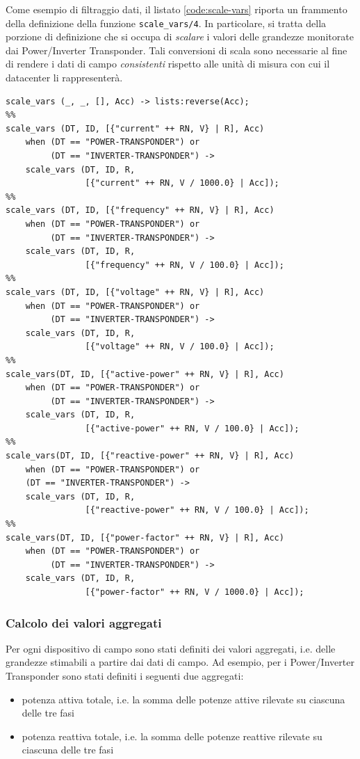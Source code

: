 %
Come esempio di filtraggio dati, il listato \ref{code:scale-vars} riporta un frammento della 
definizione della funzione \texttt{scale\_vars/4}. In particolare, si tratta della porzione di 
definizione che si occupa di \emph{scalare} i valori delle grandezze monitorate 
dai Power/Inverter Transponder.
%
Tali conversioni di scala sono necessarie al fine di rendere i dati di campo \emph{consistenti} 
rispetto alle unit\`a di misura con cui il datacenter li rappresenter\`a.
%
\begin{lstlisting}[caption={\emph{Scaling} delle misure del Power Transponder}, label={code:scale-vars},frame=trBL]
scale_vars (_, _, [], Acc) -> lists:reverse(Acc);
%%
scale_vars (DT, ID, [{"current" ++ RN, V} | R], Acc) 
    when (DT == "POWER-TRANSPONDER") or 
         (DT == "INVERTER-TRANSPONDER") ->
    scale_vars (DT, ID, R, 
                [{"current" ++ RN, V / 1000.0} | Acc]);
%%
scale_vars (DT, ID, [{"frequency" ++ RN, V} | R], Acc)
    when (DT == "POWER-TRANSPONDER") or 
         (DT == "INVERTER-TRANSPONDER") ->
    scale_vars (DT, ID, R, 
                [{"frequency" ++ RN, V / 100.0} | Acc]);
%%
scale_vars (DT, ID, [{"voltage" ++ RN, V} | R], Acc)
    when (DT == "POWER-TRANSPONDER") or 
         (DT == "INVERTER-TRANSPONDER") ->
    scale_vars (DT, ID, R, 
                [{"voltage" ++ RN, V / 100.0} | Acc]);
%%
scale_vars(DT, ID, [{"active-power" ++ RN, V} | R], Acc)
    when (DT == "POWER-TRANSPONDER") or 
         (DT == "INVERTER-TRANSPONDER") ->
    scale_vars (DT, ID, R, 
                [{"active-power" ++ RN, V / 100.0} | Acc]);
%%
scale_vars(DT, ID, [{"reactive-power" ++ RN, V} | R], Acc)
    when (DT == "POWER-TRANSPONDER") or 
    (DT == "INVERTER-TRANSPONDER") ->
    scale_vars (DT, ID, R, 
                [{"reactive-power" ++ RN, V / 100.0} | Acc]);
%%
scale_vars(DT, ID, [{"power-factor" ++ RN, V} | R], Acc)
    when (DT == "POWER-TRANSPONDER") or 
         (DT == "INVERTER-TRANSPONDER") ->
    scale_vars (DT, ID, R, 
                [{"power-factor" ++ RN, V / 1000.0} | Acc]);
\end{lstlisting}
%

%
\subsubsection{Calcolo dei valori aggregati}
%
Per ogni dispositivo di campo sono stati definiti dei valori aggregati, i.e. delle 
grandezze stimabili a partire dai dati di campo. 
%
Ad esempio, per i Power/Inverter Transponder sono stati definiti i seguenti due 
aggregati:
%
\begin{itemize}
\item potenza attiva totale, i.e. la somma delle potenze attive rilevate su 
      ciascuna delle tre fasi
\item potenza reattiva totale, i.e. la somma delle potenze reattive rilevate su
      ciascuna delle tre fasi 
\end{itemize}
%

